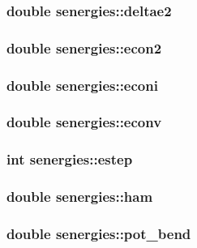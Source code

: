 \subsubsection{\setlength{\rightskip}{0pt plus 5cm}double {\bf senergies::deltae2}}\label{structsenergies_7594dabf8b9914ae4fc90856b7269f0b}


\subsubsection{\setlength{\rightskip}{0pt plus 5cm}double {\bf senergies::econ2}}\label{structsenergies_a58abfafc44869e664ec21ad732fc62b}


\subsubsection{\setlength{\rightskip}{0pt plus 5cm}double {\bf senergies::econi}}\label{structsenergies_089f7b5b8287bf40c69acd6796c17489}


\subsubsection{\setlength{\rightskip}{0pt plus 5cm}double {\bf senergies::econv}}\label{structsenergies_f3250eb0109f6af43f079e3a5ec265bf}


\subsubsection{\setlength{\rightskip}{0pt plus 5cm}int {\bf senergies::estep}}\label{structsenergies_20536b001b32673c5b1dec2a42f9aaea}


\subsubsection{\setlength{\rightskip}{0pt plus 5cm}double {\bf senergies::ham}}\label{structsenergies_9bf70e387798c075883677a84ada36d6}


\subsubsection{\setlength{\rightskip}{0pt plus 5cm}double {\bf senergies::pot\_\-bend}}\label{structsenergies_3bf5ca5cd4083fe5c22e94f50a3666ab}



